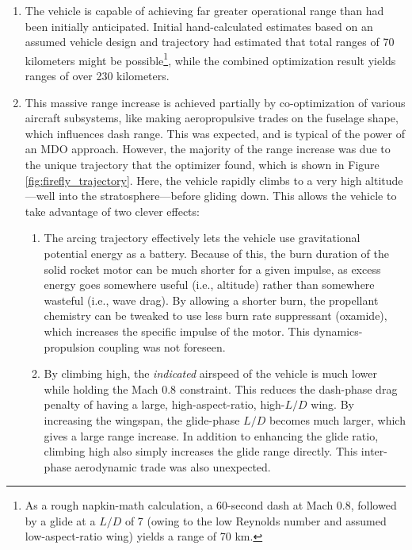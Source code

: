 \begin{enumerate}
    \item The vehicle is capable of achieving far greater operational range than had been initially anticipated. Initial hand-calculated estimates based on an assumed vehicle design and trajectory had estimated that total ranges of 70 kilometers might be possible\footnote{As a rough napkin-math calculation, a 60-second dash at Mach 0.8, followed by a glide at a $L/D$ of 7 (owing to the low Reynolds number and assumed low-aspect-ratio wing) yields a range of 70 km.}, while the combined optimization result yields ranges of over 230 kilometers.
    \item This massive range increase is achieved partially by co-optimization of various aircraft subsystems, like making aeropropulsive trades on the fuselage shape, which influences dash range. This was expected, and is typical of the power of an MDO approach. However, the majority of the range increase was due to the unique trajectory that the optimizer found, which is shown in Figure \ref{fig:firefly_trajectory}. Here, the vehicle rapidly climbs to a very high altitude—well into the stratosphere—before gliding down. This allows the vehicle to take advantage of two clever effects:
    \begin{enumerate}
        \item The arcing trajectory effectively lets the vehicle use gravitational potential energy as a battery. Because of this, the burn duration of the solid rocket motor can be much shorter for a given impulse, as excess energy goes somewhere useful (i.e., altitude) rather than somewhere wasteful (i.e., wave drag). By allowing a shorter burn, the propellant chemistry can be tweaked to use less burn rate suppressant (oxamide), which increases the specific impulse of the motor. This dynamics-propulsion coupling was not foreseen.
        \item By climbing high, the \emph{indicated} airspeed of the vehicle is much lower while holding the Mach 0.8 constraint. This reduces the dash-phase drag penalty of having a large, high-aspect-ratio, high-$L/D$ wing. By increasing the wingspan, the glide-phase $L/D$ becomes much larger, which gives a large range increase. In addition to enhancing the glide ratio, climbing high also simply increases the glide range directly. This inter-phase aerodynamic trade was also unexpected.
    \end{enumerate}
\end{enumerate}

